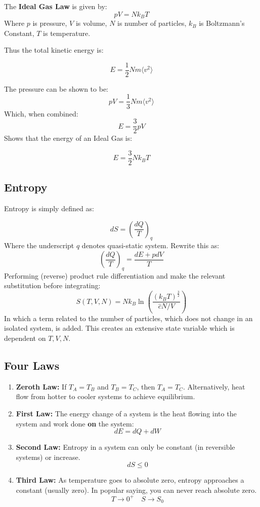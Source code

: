 \documentclass[12pt]{article}
\begin{document}
The \textbf{Ideal Gas Law} is given by:
\[\boxed{pV = Nk_B T}\]
Where $p$ is pressure, $V$ is volume, $N$ is number of particles, $k_B$ is Boltzmann's Constant, $T$ is temperature.

Thus the total kinetic energy is:

\[ E = \frac12 N m \langle v^2 \rangle\]

The pressure can be shown to be:
\[ pV =\frac13 Nm\langle v^2\rangle\]
Which, when combined:
\[E = \frac32pV\]
Shows that the energy of an Ideal Gas is:

\[ E = \frac32 Nk_B T\]

\subsection{Entropy}
Entropy is simply defined as:

\[ dS = \left(\frac{dQ}{T}\right)_q  \]
Where the underscript $q$ denotes quasi-static system. Rewrite this as:
\[\left(\frac{dQ}{T}\right)_q = \frac{dE + pdV}{T}\]
Performing (reverse) product rule differentiation and make the relevant substitution before integrating:
\[ S(T,V, N) = N k_B\ln{\left(\frac{(k_B T)^\frac32}{\hat{c}N/V}\right)}\]
In which a term related to the number of particles, which does not change in an isolated system, is added. This creates an extensive state variable which is dependent on $T,V,N$.  



\subsection{Four Laws}

\begin{enumerate}
    \item \textbf{Zeroth Law:} If $T_A = T_B$ and $T_B = T_C$, then $T_A =T_C$. Alternatively, heat flow from hotter to cooler systems to achieve equilibrium.
    \item \textbf{First Law:} The energy change of a system is the heat flowing into the system and work done \textbf{on} the system: \[dE = dQ + dW\]
    \item \textbf{Second Law:} Entropy in a system can only be constant (in reversible systems) or increase. \[dS \leq 0\]
    \item \textbf{Third Law:} As temperature goes to absolute zero, entropy approaches a constant (usually zero). In popular saying, you can never reach absolute zero. \[T \to 0^+ \quad S\to S_0\]
\end{enumerate}
\end{document}
